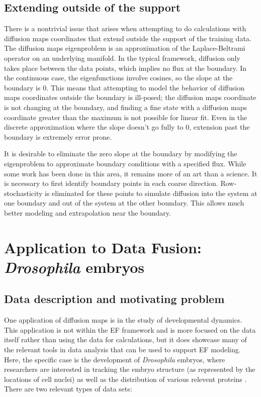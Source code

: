 \documentclass[12pt]{article}
\begin{document}
\subsection{Extending outside of the support}
There is a nontrivial issue that arises when attempting to do calculations with diffusion maps coordinates that extend outside the support of the training data. The diffusion maps eigenproblem is an approximation of the Laplace-Beltrami operator on an underlying manifold. In the typical framework, diffusion only takes place between the data points, which implies no flux at the boundary. In the continuous case, the eigenfunctions involve cosines, so the slope at the boundary is 0. This means that attempting to model the behavior of diffusion maps coordinates outside the boundary is ill-posed; the diffusion maps coordinate is not changing at the boundary, and finding a fine state with a diffusion maps coordinate greater than the maximum is not possible for linear fit. Even in the discrete approximation where the slope doesn't go fully to 0, extension past the boundary is extremely error prone.\vspace{1mm}

It is desirable to eliminate the zero slope at the boundary by modifying the eigenproblem to approximate boundary conditions with a specified flux. While some work has been done in this area, it remains more of an art than a science. It is necessary to first identify boundary points in each coarse direction. Row-stochasticity is eliminated for these points to simulate diffusion into the system at one boundary and out of the system at the other boundary. This allows much better modeling and extrapolation near the boundary.

\section{Application to Data Fusion: \textit{Drosophila} embryos}

\subsection{Data description and motivating problem}

One application of diffusion maps is in the study of developmental dynamics. This application is not within the EF framework and is more focused on the data itself rather than using the data for calculations, but it does showcase many of the relevant tools in data analysis that can be used to support EF modeling. Here, the specific case is the development of \textit{Drosophila} embryos, where researchers are interested in tracking the embryo structure (as represented by the locations of cell nuclei) as well as the distribution of various relevent proteins \cite{Lim2015} \cite{Dsilva2015a}. There are two relevant types of data sets:
\end{document}
